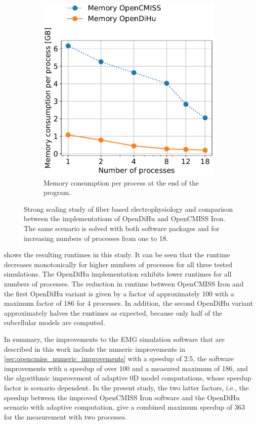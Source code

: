 \begin{figure}[H]
\begin{subfigure}[t]{0.47\textwidth}
    \includegraphics[width=\textwidth]{images/results/studies/0_strong_scaling_memory.pdf}%
    \caption{Memory consumption per process at the end of the program.}%
    \label{fig:0_strong_scaling_memory}%
  \end{subfigure}   
  \caption{Strong scaling study of fiber based electrophysiology and comparison between the implementations of OpenDiHu and OpenCMISS Iron. The same scenario is solved with both software packages and for increasing numbers of processes from one to 18.}%
  \label{fig:0_strong_scaling}%
\end{figure}%

 shows the resulting runtimes in this study. It can be seen that the runtime decreases monotonically for higher numbers of processes for all three tested simulations. The OpenDiHu implementation exhibits lower runtimes for all numbers of processes. The reduction in runtime between OpenCMISS Iron and the first OpenDiHu variant is given by a factor of approximately 100 with a maximum factor of 186 for 4 processes. In addition, the second OpenDiHu variant approximately halves the runtimes as expected, because only half of the subcellular models are computed.

In summary, the improvements to the EMG simulation software that are described in this work include the numeric improvements in \cref{sec:opencmiss_numeric_improvements} with a speedup of 2.5, the software improvements with a speedup of over 100 and a measured maximum of 186, and the algorithmic improvement of adaptive 0D model computations, whose speedup factor is scenario dependent. In the present study, the two latter factors, i.e., the speedup between the improved OpenCMISS Iron software and the OpenDiHu scenario with adaptive computation, give a combined maximum speedup of 363 for the measurement with two processes.


